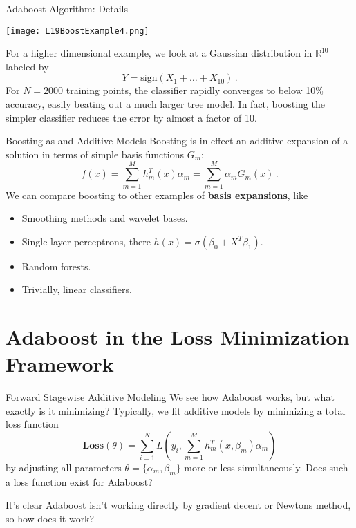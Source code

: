 \documentclass[10pt, table, dvipsnames,xcdraw, handout]{beamer}
\newcommand{\bR}{\ensuremath{\mathbb{R}}}
\begin{document}
\begin{frame}[fragile]{Adaboost Algorithm: Details}
  \begin{minipage}[t][0.5\textheight][t]{\textwidth}
	\centering \texttt{[image: L19BoostExample4.png]} 
  \end{minipage}
  \vfill
\begin{minipage}[t][0.5\textheight][t]{\textwidth}
For a higher dimensional example, we look at a Gaussian distribution in $\bR^{10}$ labeled by 
$$
Y = \text{sign}(X_1 + \ldots + X_{10})\,.
$$\pause 
For $N=2000$ training points, the classifier rapidly converges to below 10\% accuracy, easily beating out a much larger tree model. \pause In fact, boosting the simpler classifier reduces the error by almost a factor of 10. 
\end{minipage}
\end{frame}







\begin{frame}[fragile]{Boosting as and Additive Models}
Boosting is in effect an additive expansion of a solution in terms of simple basis functions $G_m$:
$$
f(x) = \sum_{m=1}^M h_m^T(x) \alpha_m = \sum_{m=1}^M \alpha_m G_m(x)\,.
$$\pause 
We can compare boosting to other examples of \textbf{basis expansions}, like
\begin{itemize}
\item[] Smoothing methods and wavelet bases.\pause
\item[] Single layer perceptrons, there $h(x) = \sigma(\beta_0 + X^T\beta_1)$. \pause
\item[] Random forests. \pause
\item[] Trivially, linear classifiers. 
\end{itemize}
\end{frame}


\section{Adaboost in the Loss Minimization Framework}



\begin{frame}[fragile]{Forward Stagewise Additive Modeling}
We see how Adaboost works, but what exactly is it minimizing? \pause Typically, we fit additive models by minimizing a total loss function
$$
\textbf{Loss}(\theta) = \sum_{i=1}^N L\left(y_i, \sum_{m=1}^M h_m^T(x,\beta_m)\alpha_m \right)
$$
by adjusting all parameters $\theta = \{\alpha_m,\beta_m\}$ more or less simultaneously. Does such a loss function exist for Adaboost?\pause

It's clear Adaboost isn't working directly by gradient decent or Newtons method, so how does it work?
\end{frame}
\end{document}
